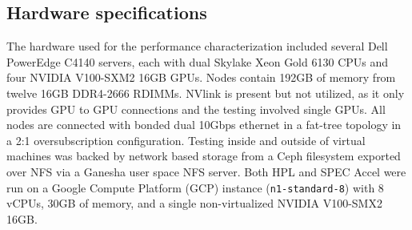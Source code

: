 \documentclass[acmsmall, authorversion]{acmart}
\begin{document}
\subsection{Hardware specifications}\label{sec:hardspec}
The hardware used for the performance characterization included several Dell PowerEdge C4140 servers, each with dual Skylake Xeon Gold 6130 \cite{skylake} CPUs and four NVIDIA V100-SXM2 16GB \cite{v100-specs} GPUs. Nodes contain 192GB of memory from twelve 16GB DDR4-2666 RDIMMs. NVlink is present but not utilized, as it only provides GPU to GPU connections and the testing involved single GPUs. All nodes are connected with bonded dual 10Gbps ethernet in a fat-tree topology in a 2:1 oversubscription configuration. Testing inside and outside of virtual machines was backed by network based storage from a Ceph filesystem exported over NFS via a Ganesha user space NFS server. Both HPL and SPEC Accel were run on a Google Compute Platform (GCP) instance ({\tt n1-standard-8}) with 8 vCPUs, 30GB of memory, and a single non-virtualized NVIDIA V100-SMX2 16GB.
\end{document}
